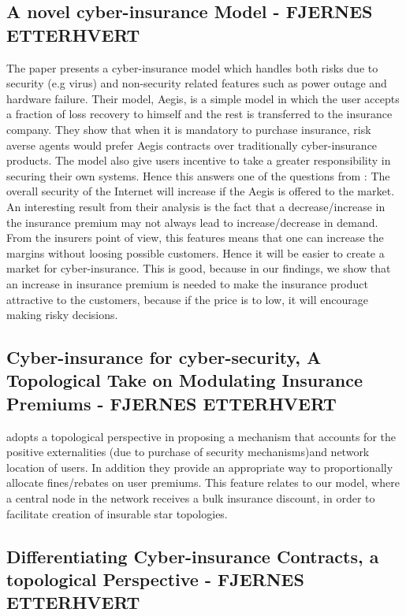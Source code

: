\subsection{A novel cyber-insurance Model  - FJERNES ETTERHVERT}
The paper \cite{pal2011aegis} presents a cyber-insurance model which handles both risks due to security (e.g virus) and non-security related features such as power outage and hardware failure. Their model, Aegis, is a simple model in which the user accepts a fraction of loss recovery to himself and the rest is transferred to the insurance company. They show that when it is mandatory to purchase insurance, risk averse agents would prefer Aegis contracts over traditionally cyber-insurance products.
The model also give users incentive to take a greater responsibility in securing their own systems. Hence this answers one of the questions from \cite{bohme2010modeling}: The overall security of the Internet will increase if the Aegis is offered to the market. An interesting result from their analysis is the fact that a decrease/increase in the insurance premium may not always lead to increase/decrease in demand. From the insurers point of view, this features means that one can increase the margins without loosing possible customers. Hence it will be easier to create a market for cyber-insurance. This is good, because in our findings, we show that an increase in insurance premium is needed to make the insurance product attractive to the customers, because if the price is to low, it will encourage making risky decisions. 


\subsection{Cyber-insurance for cyber-security, A Topological Take on Modulating Insurance Premiums - FJERNES ETTERHVERT}
\cite{pal2012cyberinsurance} adopts a topological perspective in proposing a mechanism that accounts for the positive
 externalities (due to purchase of security mechanisms)and network location of users. In addition they provide an appropriate way to proportionally allocate fines/rebates on user premiums. This feature relates to our model, where a central node in the network receives a bulk insurance discount, in order to facilitate creation of insurable star topologies. 
  
  
 
 
\subsection{Differentiating Cyber-insurance Contracts, a topological Perspective - FJERNES ETTERHVERT}

